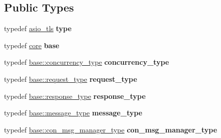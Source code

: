 \subsection*{Public Types}
\begin{DoxyCompactItemize}
\item 
typedef \hyperlink{structwebsocketpp_1_1config_1_1asio__tls}{asio\+\_\+tls} {\bfseries type}\hypertarget{structwebsocketpp_1_1config_1_1asio__tls_a92b38c443d4d89c2acf4490e696e0810}{}\label{structwebsocketpp_1_1config_1_1asio__tls_a92b38c443d4d89c2acf4490e696e0810}

\item 
typedef \hyperlink{structwebsocketpp_1_1config_1_1core}{core} {\bfseries base}\hypertarget{structwebsocketpp_1_1config_1_1asio__tls_ad3e689ff15338d7bb3647e9af27d4f2f}{}\label{structwebsocketpp_1_1config_1_1asio__tls_ad3e689ff15338d7bb3647e9af27d4f2f}

\item 
typedef \hyperlink{classwebsocketpp_1_1concurrency_1_1basic}{base\+::concurrency\+\_\+type} {\bfseries concurrency\+\_\+type}\hypertarget{structwebsocketpp_1_1config_1_1asio__tls_a94dbb7a141044dbc99de282fdeb560d8}{}\label{structwebsocketpp_1_1config_1_1asio__tls_a94dbb7a141044dbc99de282fdeb560d8}

\item 
typedef \hyperlink{classwebsocketpp_1_1http_1_1parser_1_1request}{base\+::request\+\_\+type} {\bfseries request\+\_\+type}\hypertarget{structwebsocketpp_1_1config_1_1asio__tls_a8435d19caaed4858faa88cae4bc46a81}{}\label{structwebsocketpp_1_1config_1_1asio__tls_a8435d19caaed4858faa88cae4bc46a81}

\item 
typedef \hyperlink{classwebsocketpp_1_1http_1_1parser_1_1response}{base\+::response\+\_\+type} {\bfseries response\+\_\+type}\hypertarget{structwebsocketpp_1_1config_1_1asio__tls_ad6c59e6090c5e66d0a9e15f4f6063631}{}\label{structwebsocketpp_1_1config_1_1asio__tls_ad6c59e6090c5e66d0a9e15f4f6063631}

\item 
typedef \hyperlink{classwebsocketpp_1_1message__buffer_1_1message}{base\+::message\+\_\+type} {\bfseries message\+\_\+type}\hypertarget{structwebsocketpp_1_1config_1_1asio__tls_a27450d727458295e6148c3ed7405e24c}{}\label{structwebsocketpp_1_1config_1_1asio__tls_a27450d727458295e6148c3ed7405e24c}

\item 
typedef \hyperlink{classwebsocketpp_1_1message__buffer_1_1alloc_1_1con__msg__manager}{base\+::con\+\_\+msg\+\_\+manager\+\_\+type} {\bfseries con\+\_\+msg\+\_\+manager\+\_\+type}\hypertarget{structwebsocketpp_1_1config_1_1asio__tls_add8c7b91ce5f365d76f1d53b37002cc9}{}\label{structwebsocketpp_1_1config_1_1asio__tls_add8c7b91ce5f365d76f1d53b37002cc9}


\end{DoxyCompactItemize}
